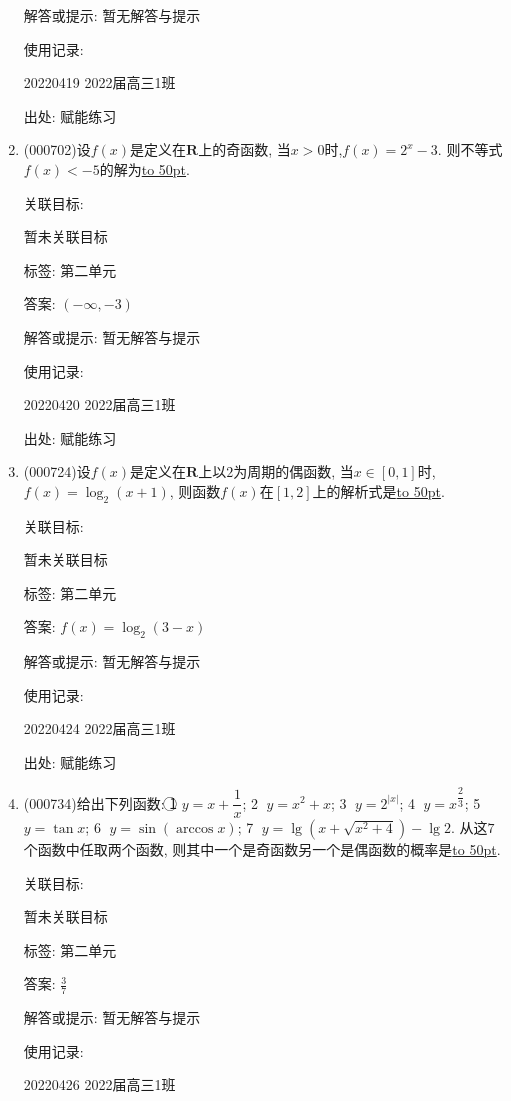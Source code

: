 \documentclass[10pt,a4paper]{article}
\newcommand{\blank}[1]{\underline{\hbox to #1pt{}}}
\begin{document}
\begin{enumerate}[1.]
解答或提示: 暂无解答与提示

使用记录:

20220419	2022届高三1班	


出处: 赋能练习
\item { (000702)}设$f(x)$是定义在$\mathbf{R}$上的奇函数, 当$x>0$时,$f(x)=2^x-3$. 则不等式$f(x)<-5$的解为\blank{50}.


关联目标:

暂未关联目标



标签: 第二单元

答案: $(-\infty,-3)$

解答或提示: 暂无解答与提示

使用记录:

20220420	2022届高三1班	


出处: 赋能练习
\item { (000724)}设$f(x)$是定义在$\mathbf{R}$上以$2$为周期的偶函数, 当$x\in [0,1]$时, $f(x)=\log_2(x+1)$, 则函数$f(x)$在$[1,2]$上的解析式是\blank{50}.


关联目标:

暂未关联目标



标签: 第二单元

答案: $f(x)=\log_2(3-x)$

解答或提示: 暂无解答与提示

使用记录:

20220424	2022届高三1班	


出处: 赋能练习
\item { (000734)}给出下列函数: \textcircled{1} $y=x+\dfrac1x$; \textcircled{2} $y={x^2}+x$; \textcircled{3} $y={2^{|x|}}$; \textcircled{4} $y={x^{\dfrac23}}$; \textcircled{5} $y=\tan x$; \textcircled{6} $y=\sin(\arccos x)$; \textcircled{7} $y=\lg(x+\sqrt{{x^2}+4})-\lg 2$. 从这$7$个函数中任取两个函数, 则其中一个是奇函数另一个是偶函数的概率是\blank{50}.


关联目标:

暂未关联目标



标签: 第二单元

答案: $\frac 37$

解答或提示: 暂无解答与提示

使用记录:

20220426	2022届高三1班	



\end{enumerate}
\end{document}
